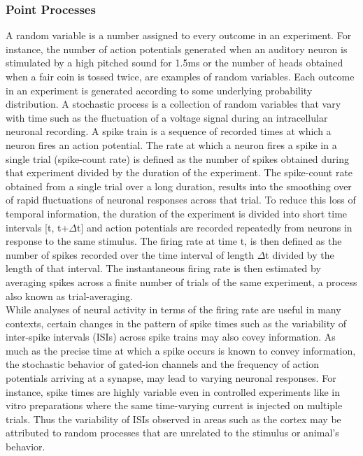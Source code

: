 \subsubsection{Point Processes}
A random variable is a number assigned to every outcome in an experiment.
For instance, the number of action potentials generated when an auditory neuron is stimulated
by a high pitched sound for 1.5ms or the number of heads obtained when a fair coin is tossed twice, are examples of random variables.  Each outcome in an experiment is generated according to some underlying probability distribution. A stochastic process is a collection  of random variables that vary with time such as the fluctuation of a voltage signal during an intracellular neuronal recording. A spike train is a sequence of recorded times at which a neuron fires an action potential. The rate at which a neuron fires a spike in a single trial (spike-count rate) is defined as the number of spikes obtained during that experiment divided by the duration of the experiment. The spike-count rate obtained from a single trial over a long duration, results into the smoothing over of rapid fluctuations of neuronal responses across that trial. To reduce this loss of temporal information, the duration of the experiment is divided into short time intervals [t, t+$\Delta$t] and action potentials are recorded repeatedly from neurons in response to the same stimulus.  The firing rate at time t, is then defined as the number of spikes recorded over the time interval of length $\Delta$t divided by the length of that interval. The instantaneous firing rate is then estimated by averaging spikes across a finite number of trials of the same experiment, a process also known as trial-averaging.\\

While analyses of neural activity in terms of the firing rate are useful in many contexts, certain changes in the pattern of spike times such as the variability of inter-spike intervals (ISIs) across spike trains may also covey information.
As much as the precise time at which a spike occurs is known to convey information, the stochastic behavior of gated-ion channels and the frequency of action potentials arriving at a synapse, may lead to varying neuronal responses.
For instance, spike times are highly variable even in controlled experiments like in vitro preparations where the same time-varying current is injected on multiple trials.
Thus the variability of ISIs observed in areas such as the cortex may be attributed to random processes that are unrelated to the stimulus or animal's behavior.\\



